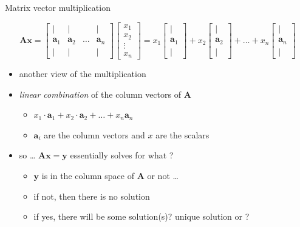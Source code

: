 \documentclass[ignorenonframetext,]{beamer}
\providecommand{\tightlist}{%
  \setlength{\itemsep}{0pt}\setlength{\parskip}{0pt}}
\newcommand{\vv}[1]{\boldsymbol{#1}}
\begin{document}
\begin{frame}{Matrix vector multiplication}
\protect\hypertarget{matrix-vector-multiplication}{}


\[\vv{A}\vv{x} = \begin{bmatrix}
\vert & \vert &  & \vert\\
\vv{a}_1 & \vv{a}_2 & \ldots & \vv{a}_{n} \\
\vert & \vert & & \vert 
\end{bmatrix} \begin{bmatrix}
x_{1}\\
x_{2}  \\
\vdots  \\
x_{n} 
\end{bmatrix} =  x_1 \begin{bmatrix}
\vert \\
\vv{a}_{1}  \\
\vert 
\end{bmatrix} + x_2 \begin{bmatrix}
\vert \\
\vv{a}_{2}  \\
\vert 
\end{bmatrix}+\ldots + x_n \begin{bmatrix}
\vert \\
\vv{a}_{n}  \\
\vert 
\end{bmatrix}\]

\begin{itemize}
\tightlist
\item
  another view of the multiplication
\item
  \emph{linear combination} of the column vectors of \(\vv{A}\)

  \begin{itemize}
  \tightlist
  \item
    \(x_1\cdot \vv{a}_1 + x_2 \cdot \vv{a}_2+\ldots + x_n\vv{a}_n\)
  \item
    \(\vv{a}_{i}\) are the column vectors and \(x\) are the scalars
  \end{itemize}
\item
  so \ldots{} \(\vv{Ax} = \vv{y}\) essentially solves for what ? \pause 

  \begin{itemize}
  \tightlist
  \item
    \(\vv{y}\) is in the column space of \(\vv{A}\) or not \ldots{}
  \item
    if not, then there is no solution
  \item
    if yes, there will be some solution(s)? unique solution or ?
  \end{itemize}
\end{itemize}

\end{frame}
\end{document}
